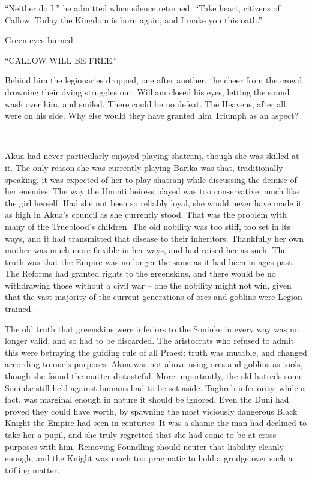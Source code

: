 \documentclass[12pt, openany]{book}
\begin{document}
“Neither do I,” he admitted when silence returned. “Take heart, citizens of Callow. Today the Kingdom is born again, and I make you this oath.”

Green eyes burned.

“CALLOW WILL BE FREE.”

Behind him the legionaries dropped, one after another, the cheer from the crowd drowning their dying struggles out. William closed his eyes, letting the sound wash over him, and smiled. There could be no defeat. The Heavens, after all, were on his side. Why else would they have granted him Triumph as an aspect?

—



Akua had never particularly enjoyed playing shatranj, though she was skilled at it. The only reason she was currently playing Barika was that, traditionally speaking, it was expected of her to play shatranj while discussing the demise of her enemies. The way the Unonti heiress played was too conservative, much like the girl herself. Had she not been so reliably loyal, she would never have made it as high in Akua’s council as she currently stood. That was the problem with many of the Trueblood’s children. The old nobility was too stiff, too set in its ways, and it had transmitted that disease to their inheritors. Thankfully her own mother was much more flexible in her ways, and had raised her as such. The truth was that the Empire was no longer the same as it had been in ages past. The Reforms had granted rights to the greenskins, and there would be no withdrawing those without a civil war – one the nobility might not win, given that the vast majority of the current generations of orcs and goblins were Legion-trained.

The old truth that greenskins were inferiors to the Soninke in every way was no longer valid, and so had to be discarded. The aristocrats who refused to admit this were betraying the guiding rule of all Praesi: truth was mutable, and changed according to one’s purposes. Akua was not above using orcs and goblins as tools, though she found the matter distasteful. More importantly, the old hatreds some Soninke still held against humans had to be set aside. Taghreb inferiority, while a fact, was marginal enough in nature it should be ignored. Even the Duni had proved they could have worth, by spawning the most viciously dangerous Black Knight the Empire had seen in centuries. It was a shame the man had declined to take her a pupil, and she truly regretted that she had come to be at cross-purposes with him. Removing Foundling should neuter that liability cleanly enough, and the Knight was much too pragmatic to hold a grudge over such a trifling matter.
\end{document}
